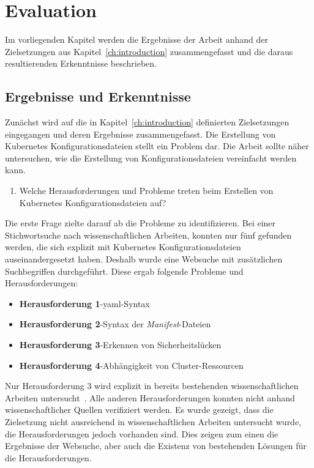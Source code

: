 \chapter{Evaluation}\label{ch:evaluation}

Im vorliegenden Kapitel werden die Ergebnisse der Arbeit anhand der Zielsetzungen aus Kapitel~\ref{ch:introduction} zusammengefasst
und die daraus resultierenden Erkenntnisse beschrieben. %

\section{Ergebnisse und Erkenntnisse}

Zunächst wird auf die in Kapitel~\ref{ch:introduction} definierten Zielsetzungen eingegangen und deren Ergebnisse zusammengefasst.
Die Erstellung von Kubernetes Konfigurationsdateien stellt ein Problem dar.
Die Arbeit sollte näher untersuchen, wie die Erstellung von Konfigurationsdateien vereinfacht werden kann.

\begin{enumerate}
  \item Welche Herausforderungen und Probleme treten beim Erstellen von Kubernetes Konfigurationsdateien auf?
\end{enumerate}
Die erste Frage zielte darauf ab die Probleme zu identifizieren. Bei einer Stichwortsuche nach wissenschaftlichen Arbeiten, konnten nur
fünf gefunden werden, die sich explizit mit Kubernetes Konfigurationsdateien
auseinandergesetzt haben.
Deshalb wurde eine Websuche mit zusätzlichen Suchbegriffen durchgeführt.
Diese ergab folgende Probleme und Herausforderungen:

\begin{itemize}
  \setlength\itemsep{-0.5cm}
  \item \textbf{Herausforderung 1}-\ac{yaml}-Syntax
  \item \textbf{Herausforderung 2}-Syntax der \textit{Manifest}-Dateien
  \item \textbf{Herausforderung 3}-Erkennen von Sicherheitslücken
  \item \textbf{Herausforderung 4}-Abhängigkeit von Cluster-Ressourcen
\end{itemize}
Nur Herausforderung 3 wird explizit in bereits bestehenden wissenschaftlichen Arbeiten untersucht~\cite{9476056,10.1145/3579639,10.1145/3468264.3473495}.
Alle anderen Herausforderungen konnten nicht anhand wissenschaftlicher Quellen verifiziert werden.
Es wurde gezeigt, dass die Zielsetzung nicht ausreichend in wissenschaftlichen Arbeiten untersucht wurde, die Herausforderungen jedoch vorhanden sind.
Dies zeigen zum einen die Ergebnisse der Websuche, aber auch die Existenz von bestehenden Lösungen für die Herausforderungen.

